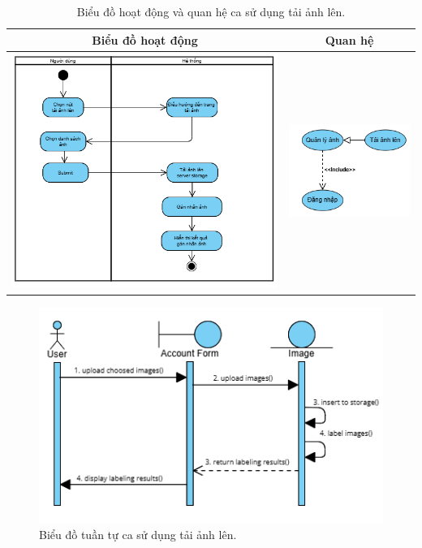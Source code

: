 \noindent 

\begin{table}[H]
\centering
\begin{tabular}{| c | c |}
    \hline
    \textbf{Biểu đồ hoạt động} & \textbf{Quan hệ} \\ 
    \hline
    \includegraphics[width=0.6\linewidth]{figures/c3/3-3-4-activity-diagram.png} 
    & 
    \includegraphics[width=0.35\linewidth]{figures/c3/3-3-4-relationship.png} \\ 
    \hline
\end{tabular}
\caption{Biểu đồ hoạt động và quan hệ ca sử dụng tải ảnh lên.}
\label{tab:upload-image-usecase-activity}
\end{table}

\begin{figure}[H]
    \centering  
    \includegraphics[width=1\textwidth]{figures/c3/3-3-4-sequence-diagram.png}
    \caption{Biểu đồ tuần tự ca sử dụng tải ảnh lên.}
    \label{fig:3-3-4-sequence-diagram}
\end{figure}